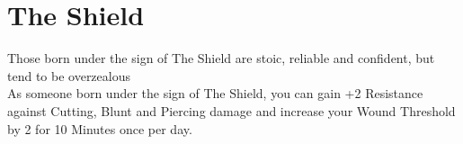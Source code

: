 \section{The Shield}

Those born under the sign of The Shield are stoic, reliable and confident, but tend to be overzealous\\
As someone born under the sign of The Shield, you can gain +2 Resistance against Cutting, Blunt and Piercing damage and increase your Wound Threshold by 2 for 10 Minutes once per day.\\